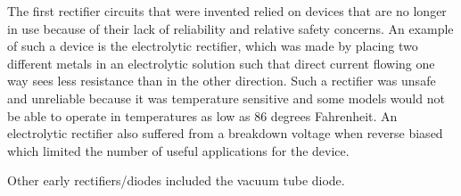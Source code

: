 
The first rectifier circuits that were invented relied
on devices that are no longer in use because of their
lack of reliability and relative safety concerns. An
example of such a device is the electrolytic rectifier,
which was made by placing two different metals in an
electrolytic solution such that direct current flowing
one way sees less resistance than in the other direction.
Such a rectifier was unsafe and unreliable because it
was temperature sensitive and some models would not
be able to operate in temperatures as low as 86 degrees
Fahrenheit. An electrolytic rectifier also suffered 
from a breakdown voltage when reverse biased which
limited the number of useful applications for the device.

Other early rectifiers/diodes included the vacuum tube diode.

